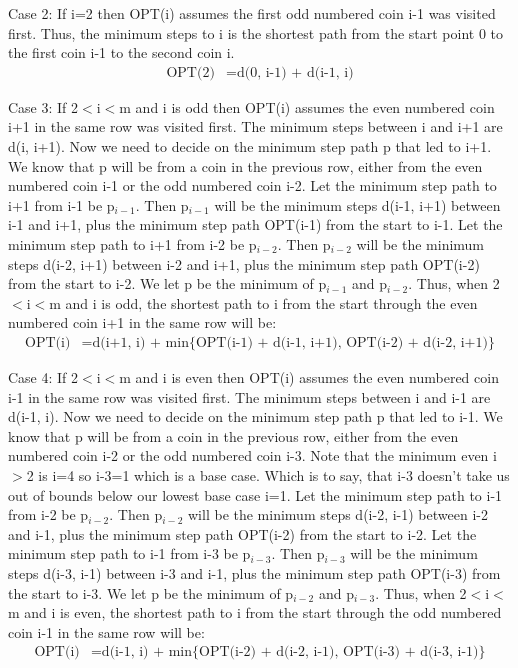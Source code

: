 \documentclass[11pt]{article}
\begin{document}
Case 2: If i=2 then OPT(i) assumes the first odd numbered coin i-1 was visited first. Thus, the minimum steps to i is the shortest path from the start point 0 to the first coin i-1 to the second coin i.
\begin{align*}
\text{OPT(2)} &= \text{d(0, i-1) + d(i-1, i)}
\end{align*}

Case 3: If 2$<$i$<$m and i is odd then OPT(i) assumes the even numbered coin i+1 in the same row was visited first. The minimum steps between i and i+1 are d(i, i+1). Now we need to decide on the minimum step path p that led to i+1. We know that p will be from a coin in the previous row, either from the even numbered coin i-1 or the odd numbered coin i-2. Let the minimum step path to i+1 from i-1 be p$_{i-1}$. Then p$_{i-1}$ will be the minimum steps d(i-1, i+1) between i-1 and i+1, plus the minimum step path OPT(i-1) from the start to i-1. Let the minimum step path to i+1 from i-2 be p$_{i-2}$. Then p$_{i-2}$ will be the minimum steps d(i-2, i+1) between i-2 and i+1, plus the minimum step path OPT(i-2) from the start to i-2. We let p be the minimum of p$_{i-1}$ and p$_{i-2}$. Thus, when 2$<$i$<$m and i is odd, the shortest path to i from the start through the even numbered coin i+1 in the same row will be:
\begin{align*}
\text{OPT(i)} &= \text{d(i+1, i) + min\{OPT(i-1) + d(i-1, i+1), OPT(i-2) + d(i-2, i+1)\}}
\end{align*}

Case 4: If 2$<$i$<$m and i is even then OPT(i) assumes the even numbered coin i-1 in the same row was visited first. The minimum steps between i and i-1 are d(i-1, i). Now we need to decide on the minimum step path p that led to i-1. We know that p will be from a coin in the previous row, either from the even numbered coin i-2 or the odd numbered coin i-3. Note that the minimum even i$>$2 is i=4 so i-3=1 which is a base case. Which is to say, that i-3 doesn't take us out of bounds below our lowest base case i=1. Let the minimum step path to i-1 from i-2 be p$_{i-2}$. Then p$_{i-2}$ will be the minimum steps d(i-2, i-1) between i-2 and i-1, plus the minimum step path OPT(i-2) from the start to i-2. Let the minimum step path to i-1 from i-3 be p$_{i-3}$. Then p$_{i-3}$ will be the minimum steps d(i-3, i-1) between i-3 and i-1, plus the minimum step path OPT(i-3) from the start to i-3. We let p be the minimum of p$_{i-2}$ and p$_{i-3}$. Thus, when 2$<$i$<$m and i is even, the shortest path to i from the start through the odd numbered coin i-1 in the same row will be:
\begin{align*}
\text{OPT(i)} &= \text{d(i-1, i) + min\{OPT(i-2) + d(i-2, i-1), OPT(i-3) + d(i-3, i-1)\}}
\end{align*}
\end{document}
